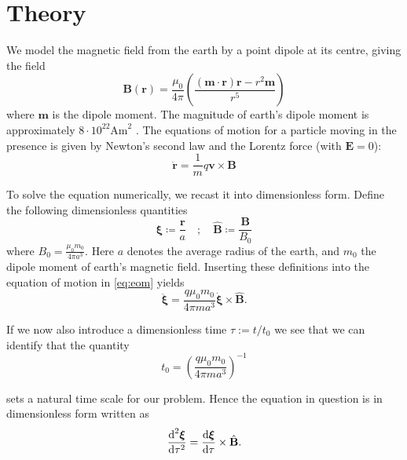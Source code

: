 \section{Theory}

We model the magnetic field from the earth by a point dipole at its centre, giving the field
\begin{equation}\label{eq:dipole}
	\mathbf{B}(\mathbf{r}) = \frac{\mu_0}{4 \pi} \left( \frac{(\mathbf{m} \cdot \mathbf{r}) \mathbf{r} - r^2 \mathbf{m}}{r^5} \right)
\end{equation}
where $\mathbf{m}$ is the dipole moment. The magnitude of earth's dipole moment is approximately $8\cdot10^{22} \mathrm{Am}^2$ \cite{Olson2006}. The equations of motion for a particle moving in the presence is given by Newton's second law and the Lorentz force (with $\mathbf{E} = 0$):
\begin{equation}\label{eq:eom}
	\ddot{\mathbf{r}} = \frac{1}{m} q \mathbf{v} \times \mathbf{B} 
\end{equation}

To solve the equation numerically, we recast it into dimensionless form. Define the following dimensionless quantities 
\begin{equation}
	\boldsymbol{\xi} \coloneqq \frac{\mathbf{r}}{a} \quad ; \quad \hat{\mathbf{B}} \coloneqq \frac{\mathbf{B}}{B_0}
\end{equation}
where $B_0 = \frac{\mu_0 m_0}{4 \pi a^3}$. Here $a$ denotes the average radius of the earth, and $m_0$ the dipole moment of earth's magnetic field. Inserting these definitions into the equation of motion in \ref{eq:eom} yields
\begin{equation}
	\ddot{\boldsymbol{\xi}} = \frac{q \mu_0 m_0}{4\pi m a^3} \dot{\boldsymbol{\xi}} \times \hat{\mathbf{B}}.
\end{equation}

If we now also introduce a dimensionless time $\tau := t/t_0$ we see that we can identify that the quantity 
\begin{equation}
	t_0 = \left(\frac{q \mu_0 m_0 }{4 \pi m a^3} \right)^{-1}
\end{equation}

sets a natural time scale for our problem. Hence the equation in question is in dimensionless form written as 
\begin{equation}\label{eq:simpleeom}
	\frac{\text{d}^2 \boldsymbol{\xi}}{\text{d}\tau^2} = \frac{\text{d} \boldsymbol{\xi}}{\text{d} \tau} \times \hat{\mathbf{B}}.
\end{equation}

